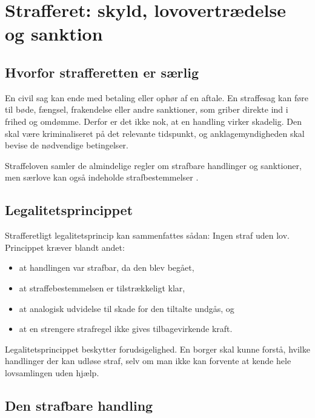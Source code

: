 \chapter{Strafferet: skyld, lovovertrædelse og sanktion}


\section{Hvorfor strafferetten er særlig}

En civil sag kan ende med betaling eller ophør af en aftale. En straffesag kan føre til bøde, fængsel, frakendelse eller andre sanktioner, som griber direkte ind i frihed og omdømme. Derfor er det ikke nok, at en handling virker skadelig. Den skal være kriminaliseret på det relevante tidspunkt, og anklagemyndigheden skal bevise de nødvendige betingelser.

Straffeloven samler de almindelige regler om strafbare handlinger og sanktioner, men særlove kan også indeholde strafbestemmelser \citep{straffeloven}.

\section{Legalitetsprincippet}

Strafferetligt legalitetsprincip kan sammenfattes sådan: Ingen straf uden lov. Princippet kræver blandt andet:
\begin{itemize}
  \item at handlingen var strafbar, da den blev begået,
  \item at straffebestemmelsen er tilstrækkeligt klar,
  \item at analogisk udvidelse til skade for den tiltalte undgås, og
  \item at en strengere strafregel ikke gives tilbagevirkende kraft.
\end{itemize}

Legalitetsprincippet beskytter forudsigelighed. En borger skal kunne forstå, hvilke handlinger der kan udløse straf, selv om man ikke kan forvente at kende hele lovsamlingen uden hjælp.

\section{Den strafbare handling}

